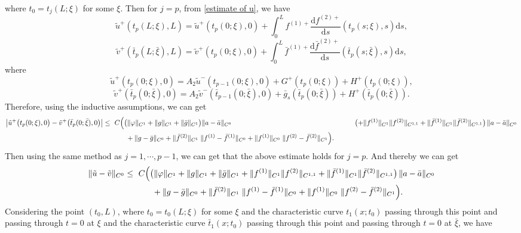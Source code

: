 \documentclass[a4paper,reqno,11pt]{amsart}
\numberwithin{equation}{section} %
\begin{document}
where $t_0=t_j(L;\xi)$ for some $\xi$. Then for $j=p$, from \eqref{estimate of u}, we have
$$
\tilde{u}^{+}\left( t_p\left( L;\xi \right) ,L \right) =\tilde{u}^{+}\left( t_p\left( 0;\xi \right) ,0 \right) +\int_{0}^L{f^{(1)+}\frac{\mathrm{d}f^{(2)+}}{\mathrm{d}s}\left( t_p\left( s;\xi \right) ,s \right) \mathrm{d}s},
$$
$$
\tilde{v}^{+}\left( \bar{t}_p\left( L;\bar{\xi} \right) ,L \right) =\tilde{v}^{+}\left( t_p\left( 0;\xi \right) ,0 \right) +\int_{0 }^L{\bar{f}^{(1)+}\frac{\mathrm{d}\bar{f}^{(2)+}}{\mathrm{d}s}\left( \bar{t}_p\left( s;\bar{\xi} \right) ,s \right) \mathrm{d}s},
$$
where
$$
\tilde{u}^{+}\left( t_p\left( 0;\xi \right) ,0 \right) =A_2\tilde{u}^{-}\left( t_{p-1}\left( 0;\xi \right) ,0 \right) +G^+ \left( t_p(0;\xi ) \right) +H^+\left( t_p(0;\xi ) \right) ,
$$
$$
\tilde{v}^{+}\left( \bar{t}_p\left( 0;\bar{\xi} \right) ,0 \right) =A_2\tilde{v}^-\left( \bar{t}_{p-1}\left( 0;\bar{\xi} \right) ,0 \right) +\bar{g}_s\left( \bar{t}_p(0;\bar{\xi}) \right) +H^+\left( \bar{t}_p(0;\bar{\xi}) \right) .
$$
Therefore, using the inductive assumptions, we can get 
$$
\begin{aligned}
\bigl\lvert \tilde u^+\bigl(t_p(0;\xi),0\bigr)- \tilde{v}^{+}\bigl(\bar t_p(0;\bar\xi),0\bigr)\bigr\rvert
\le{}&\ C\Bigl(
  \bigl(\|\varphi\|_{C^{1}}+\|g\|_{C^{1}}+\|\bar g\|_{C^{1}}\bigr) \|a-\bar a\|_{C^{0}} \Bigr.
&\qquad   \bigl(+ \|f^{(1)}\|_{C^{1}}\|f^{(2)}\|_{C^{1,1}}
   + \|\bar f^{(1)}\|_{C^{1}}\|\bar f^{(2)}\|_{C^{1,1}}\bigr)\,
   \|a-\bar a\|_{C^{0}}\\
&\qquad + \Bigl. \|g-\bar g\|_{C^{0}}
  + \|\bar f^{(2)}\|_{C^{1}}\;\|f^{(1)}-\bar f^{(1)}\|_{C^{0}}
  + \|f^{(1)}\|_{C^{0}}\;\|f^{(2)}-\bar f^{(2)}\|_{C^{1}}
\Bigr).
\end{aligned}
$$
Then using the same method as $j=1,\cdots,p-1$, we can get that the above estimate holds for $j=p$. And thereby we can get
$$
\begin{aligned}
\|\tilde u-\tilde v\|_{C^{0}}
\le{}&\ C\Bigl(
  \bigl(\|\varphi\|_{C^{1}}+\|g\|_{C^{1}}+\|\bar g\|_{C^{1}}
  + \|f^{(1)}\|_{C^{1}}\|f^{(2)}\|_{C^{1,1}}
  + \|\bar f^{(1)}\|_{C^{1}}\|\bar f^{(2)}\|_{C^{1,1}}\bigr)\,
  \|a-\bar a\|_{C^{0}} \\
&\qquad + \|g-\bar g\|_{C^{0}}
  + \|\bar f^{(2)}\|_{C^{1}}\;\|f^{(1)}-\bar f^{(1)}\|_{C^{0}}
  + \|f^{(1)}\|_{C^{0}}\;\|f^{(2)}-\bar f^{(2)}\|_{C^{1}}
\Bigr).
\end{aligned}
$$
Considering the point $(t_0,L)$, where $t_0=t_0(L;\xi)$ for some $\xi$ and the characteristic curve $t_1(x;t_0)$ passing through this point and passing through $t=0$ at $\xi$ and the characteristic curve $\bar{t}_1(x;t_0)$ passing through this point and passing through $t=0$ at $\bar{\xi}$, we have
\end{document}
